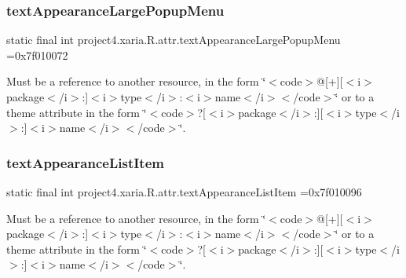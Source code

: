 \subsubsection{\texorpdfstring{text\+Appearance\+Large\+Popup\+Menu}{textAppearanceLargePopupMenu}}
{\footnotesize\ttfamily static final int project4.\+xaria.\+R.\+attr.\+text\+Appearance\+Large\+Popup\+Menu =0x7f010072\hspace{0.3cm}{\ttfamily [static]}}

Must be a reference to another resource, in the form \char`\"{}$<$code$>$@\mbox{[}+\mbox{]}\mbox{[}$<$i$>$package$<$/i$>$\+:\mbox{]}$<$i$>$type$<$/i$>$\+:$<$i$>$name$<$/i$>$$<$/code$>$\char`\"{} or to a theme attribute in the form \char`\"{}$<$code$>$?\mbox{[}$<$i$>$package$<$/i$>$\+:\mbox{]}\mbox{[}$<$i$>$type$<$/i$>$\+:\mbox{]}$<$i$>$name$<$/i$>$$<$/code$>$\char`\"{}. \mbox{\label{classproject4_1_1xaria_1_1R_1_1attr_a6e03533602c64546d87ed669733fbb32}} 
\subsubsection{\texorpdfstring{text\+Appearance\+List\+Item}{textAppearanceListItem}}
{\footnotesize\ttfamily static final int project4.\+xaria.\+R.\+attr.\+text\+Appearance\+List\+Item =0x7f010096\hspace{0.3cm}{\ttfamily [static]}}

Must be a reference to another resource, in the form \char`\"{}$<$code$>$@\mbox{[}+\mbox{]}\mbox{[}$<$i$>$package$<$/i$>$\+:\mbox{]}$<$i$>$type$<$/i$>$\+:$<$i$>$name$<$/i$>$$<$/code$>$\char`\"{} or to a theme attribute in the form \char`\"{}$<$code$>$?\mbox{[}$<$i$>$package$<$/i$>$\+:\mbox{]}\mbox{[}$<$i$>$type$<$/i$>$\+:\mbox{]}$<$i$>$name$<$/i$>$$<$/code$>$\char`\"{}. \mbox{\label{classproject4_1_1xaria_1_1R_1_1attr_a519eecd1eca641d59774d66cfdbdc174}} 
